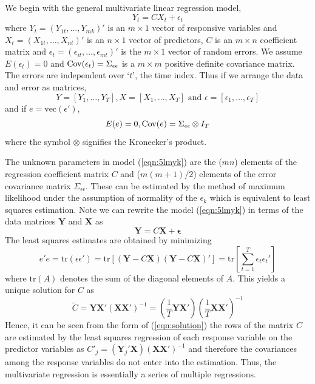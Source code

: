 We begin with the general multivariate linear regression model,
	\begin{equation}\label{eqn:5lmyk}
	Y_t = C X_t + \epsilon_t
	\end{equation}
where $Y_t=(Y_{1t},\ldots,Y_{mk})'$ is an $m \times 1$ vector of responsive variables and $X_t=(X_{1t},\ldots,X_{nt})'$ is an $n \times 1$ vector of predictors, $C$ is an $m \times n$ coefficient matrix and $\epsilon_t=(\epsilon_{it}, \ldots, \epsilon_{mt})'$ is the $m \times 1$ vector of random errors. We assume $E(\epsilon_t)=0$ and $\operatorname{Cov}(\epsilon_t)=\Sigma_{\epsilon \epsilon}$ is a $m \times m$ positive definite covariance matrix. The errors are independent over `$t$', the time index. Thus if we arrange the data and error as matrices,
	\begin{equation}\label{eqn:5yyt}
	Y=[Y_1,\ldots,Y_T], X=[X_1,\ldots,X_T] \text{ and }\epsilon=[\epsilon_1, \ldots,\epsilon_T]
	\end{equation}
and if $e=\text{vec}(\epsilon')$,
	\begin{equation}\label{eqn:5Ee0}
	E(e)=0, \Cov(e)= \Sigma_{\epsilon \epsilon} \otimes I_T
	\end{equation}
where the symbol $\otimes$ signifies the Kronecker's product. 


The unknown parameters in model (\ref{eqn:5lmyk}) are the ($mn$) elements of the regression coefficient matrix $C$ and ($m(m+1)/2$) elements of the error covariance matrix $\Sigma_{\epsilon \epsilon}$. These can be estimated by the method of maximum likelihood under the assumption of normality of the $\epsilon_k$ which is equivalent to least squares estimation. Note we can rewrite the model (\ref{eqn:5lmyk}) in terms of the data matrices $\mathbf{Y}$ and $\mathbf{X}$ as
	\begin{equation}\label{eqn:rewrite}
	\mathbf{Y} = C \mathbf{X} + \mathbf{\epsilon}
	\end{equation}
The least squares estimates are obtained by minimizing
	\begin{equation}\label{eqn:minimize}
	e'e=\text{tr}(\epsilon\epsilon')=\text{tr}[(\mathbf{Y}-C\mathbf{X})(\mathbf{Y}-C\mathbf{X})']=\text{tr}\left[\sum_{t=1}^T \epsilon_t \epsilon_t'\right]
	\end{equation}
where $\text{tr}(A)$ denotes the sum of the diagonal elements of $A$. This yields a unique solution for $C$ as
	\begin{equation}\label{eqn:solution}
	\tilde{C}=\mathbf{Y} \mathbf{X}' (\mathbf{X}\mathbf{X}')^{-1} = \left(\dfrac{1}{T} \mathbf{Y}\mathbf{X}'\right) \left(\dfrac{1}{T} \mathbf{X}\mathbf{X}' \right)^{-1}
	\end{equation}
Hence, it can be seen from the form of (\ref{eqn:solution}) the rows of the matrix $C$ are estimated by the least squares regression of each response variable on the predictor variables as $C'_j=(\mathbf{Y}_j' \mathbf{X})(\mathbf{X}\mathbf{X}')^{-1}$ and therefore the covariances among the response variables do not enter into the estimation. Thus, the multivariate regression is essentially a series of multiple regressions. 


